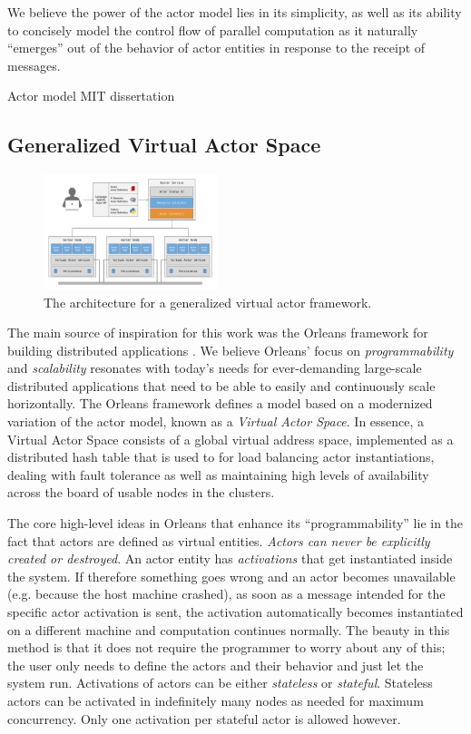 \documentclass[conference,twocolumn,10pt]{IEEEtran}
\begin{document}
We believe the power of the actor model lies in its simplicity, as well as its ability to concisely model the control flow of parallel computation as it naturally ``emerges'' out of the behavior of actor entities in response to the receipt of messages.

Actor model MIT dissertation \cite{hewitt_viewing_1977, agha_actors:_1985}


\subsection{Generalized Virtual Actor Space}

\begin{figure}[!t]
    \centering
    \includegraphics[width=0.45\textwidth]{architecture}
    \caption{The architecture for a generalized virtual actor framework.}
    \label{fig:architecture}
\end{figure}

The main source of inspiration for this work was the Orleans framework for building distributed applications \cite{bernstein_orleans:_2014}. We believe Orleans' focus on \textit{programmability} and \textit{scalability} resonates with today's needs for ever-demanding large-scale distributed applications that need to be able to easily and continuously scale horizontally. The Orleans  framework defines a model based on a modernized variation of the actor model, known as a \textit{Virtual Actor Space}. In essence, a Virtual Actor Space consists of a global virtual address space, implemented as a distributed hash table that is used to for load balancing actor instantiations, dealing with fault tolerance as well as maintaining high levels of availability across the board of usable nodes in the clusters.

The core high-level ideas in Orleans that enhance its ``programmability'' lie in the fact that actors are defined as virtual entities. \textit{Actors can never be explicitly created or destroyed}. An actor entity has \textit{activations} that get instantiated inside the system. If therefore something goes wrong and an actor becomes unavailable (e.g. because the host machine crashed), as soon as a message intended for the specific actor activation is sent, the activation automatically becomes instantiated on a different machine and computation continues normally. The beauty in this method is that it does not require the programmer to worry about any of this; the user only needs to define the actors and their behavior and just let the system run. Activations of actors can be either \textit{stateless} or \textit{stateful}. Stateless actors can be activated in indefinitely many nodes as needed for maximum concurrency. Only one activation per stateful actor is allowed however.
\end{document}
